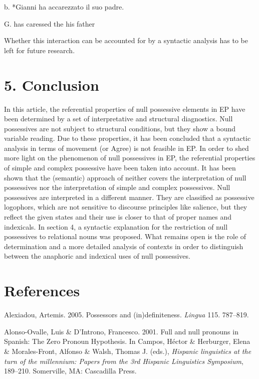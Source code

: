\documentclass[output=paper]{langsci/langscibook}
\begin{document}
  b.  *Gianni ha accarezzato il suo padre.

G. has caressed the his father

Whether this interaction can be accounted for by a syntactic analysis has to be left for future research.

\section{ 5. Conclusion}

In this article, the referential properties of null possessive elements in EP have been determined by a set of interpretative and structural diagnostics. Null possessives are not subject to structural conditions, but they show a bound variable reading. Due to these properties, it has been concluded that a syntactic analysis in terms of movement (or Agree) is not feasible in EP. In order to shed more light on the phenomenon of null possessives in EP, the referential properties of simple and complex possessive have been taken into account. It has been shown that the (semantic) approach of \citet{Reinhart2006} neither covers the interpretation of null possessives nor the interpretation of simple and complex possessives. Null possessives are interpreted in a different manner. They are classified as possessive logophors, which are not sensitive to discourse principles like salience, but they reflect the given states and their use is closer to that of proper names and indexicals. In section 4, a syntactic explanation for the restriction of null possessives to relational nouns was proposed. What remains open is the role of determination and a more detailed analysis of contexts in order to distinguish between the anaphoric and indexical uses of null possessives.

\section{ References}

Alexiadou, Artemis. 2005. Possessors and (in)definiteness. \textit{Lingua} 115. 787–819.

Alonso-Ovalle, Luis \& D’Introno, Francesco. 2001. Full and null pronouns in Spanish: The Zero Pronoun Hypothesis. In Campos, Héctor \& Herburger, Elena \& Morales-Front, Alfonso \& Walsh, Thomas J. (eds.), \textit{Hispanic linguistics at the turn of the millennium: Papers from the 3rd Hispanic Linguistics Symposium}, 189–210. Somerville, MA: Cascadilla Press.
\end{document}

